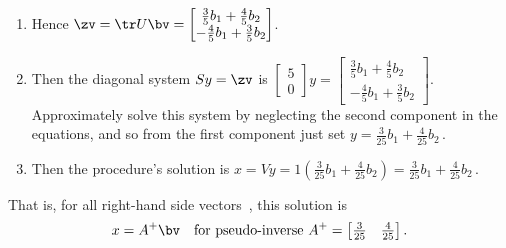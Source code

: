 \begin{example}
\begin{solution}
\begin{enumerate}
\item Hence \(\zv=\tr U\bv=\begin{bmatrix} \tfrac35b_1+\tfrac45b_2\\-\tfrac45b_1+\tfrac35b_2 \end{bmatrix}\).
\item Then the diagonal system \(Sy=\zv\) is \(\begin{bmatrix} 5\\0 \end{bmatrix}y=\begin{bmatrix} \tfrac35b_1+\tfrac45b_2\\-\tfrac45b_1+\tfrac35b_2 \end{bmatrix}\). 
Approximately solve this system by neglecting the second component in the equations, and so from the first component just set \(y=\tfrac3{25}b_1+\tfrac4{25}b_2\)\,.
\item Then the procedure's solution is \(x=Vy=1(\tfrac3{25}b_1+\tfrac4{25}b_2)=\tfrac3{25}b_1+\tfrac4{25}b_2\)\,.
\end{enumerate}
That is, for all right-hand side vectors~\bv, this  solution is
\begin{equation*}
x=A^+\bv\quad\text{for pseudo-inverse }A^+=\begin{bmatrix} \tfrac3{25}& \tfrac4{25} \end{bmatrix}.
\end{equation*}
\end{solution}
\end{example}




